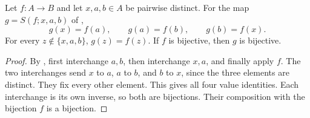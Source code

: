 \begin{lemma}
Let $f:A\to B$ and let $x,a,b\in A$ be pairwise distinct. For the map
$g=S(f;x,a,b)$ of ,
\[
g(x)=f(a),\qquad g(a)=f(b),\qquad g(b)=f(x).
\]
For every $z\notin\{x,a,b\}$, $g(z)=f(z)$. If $f$ is bijective, then $g$
is bijective.
\end{lemma}
\begin{proof}
By , first interchange $a,b$, then
interchange $x,a$, and finally apply $f$. The two interchanges send
$x$ to $a$, $a$ to $b$, and $b$ to $x$, since the three elements are
distinct. They fix every other element. This gives all four value
identities. Each interchange is its own inverse, so both are
bijections. Their composition with the bijection $f$ is a bijection.
\end{proof}
